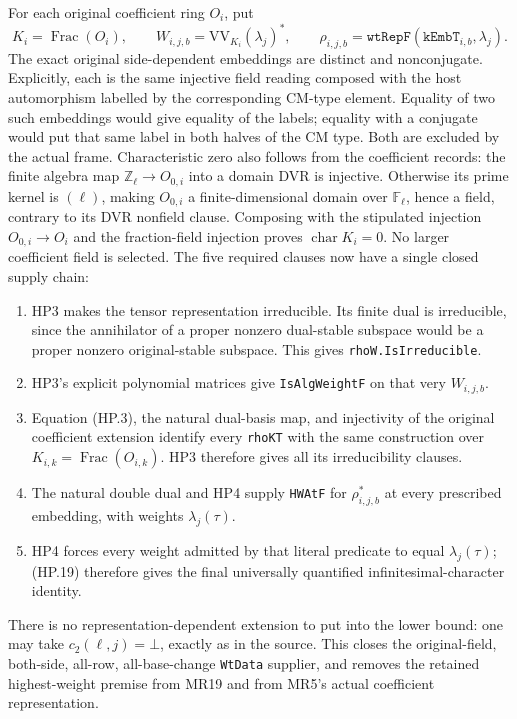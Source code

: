 For each original coefficient ring $O_i$, put
\[
 K_i=\operatorname{Frac}(O_i),\qquad
 W_{i,j,b}=\mathrm{VV}_{K_i}(\lambda_j)^*,\qquad
 \rho_{i,j,b}=\texttt{wtRepF}(\texttt{kEmbT}_{i,b},\lambda_j).
 \tag{HP.20}
\]
The exact original side-dependent embeddings are distinct and
nonconjugate.  Explicitly, each is the same injective field reading
composed with the host automorphism labelled by the corresponding
CM-type element.  Equality of two such embeddings would give equality
of the labels; equality with a conjugate would put that same label
in both halves of the CM type.  Both are excluded by the actual frame.
Characteristic zero also follows from the coefficient records: the
finite algebra map $\mathbb Z_\ell\to O_{0,i}$ into a domain DVR is
injective.  Otherwise its prime kernel is $(\ell)$, making $O_{0,i}$
a finite-dimensional domain over $\mathbb F_\ell$, hence a field,
contrary to its DVR nonfield clause.  Composing with the stipulated
injection $O_{0,i}\to O_i$ and the fraction-field injection proves
$\operatorname{char}K_i=0$.  No larger coefficient field is selected.  The five required clauses
now have a single closed supply chain:
\begin{enumerate}
\item HP3 makes the tensor representation irreducible.  Its finite
      dual is irreducible, since the annihilator of a proper nonzero
      dual-stable subspace would be a proper nonzero original-stable
      subspace.  This gives \texttt{rhoW.IsIrreducible}.
\item HP3's explicit polynomial matrices give
      \texttt{IsAlgWeightF} on that very $W_{i,j,b}$.
\item Equation (HP.3), the natural dual-basis map, and injectivity of
      the original coefficient extension identify every
      \texttt{rhoKT} with the same construction over
      $K_{i,k}=\operatorname{Frac}(O_{i,k})$.
      HP3 therefore gives all its irreducibility clauses.
\item The natural double dual and HP4 supply \texttt{HWAtF} for
      $\rho_{i,j,b}^{*}$ at every prescribed embedding, with weights
      $\lambda_j(\tau)$.
\item HP4 forces every weight admitted by that literal predicate to
      equal $\lambda_j(\tau)$; (HP.19) therefore gives the final
      universally quantified infinitesimal-character identity.
\end{enumerate}
There is no representation-dependent extension to put into the lower
bound: one may take $c_2(\ell,j)=\bot$, exactly as in the source.
This closes the original-field, both-side, all-row, all-base-change
\texttt{WtData} supplier, and removes the retained highest-weight
premise from MR19 and from MR5's actual coefficient representation.

